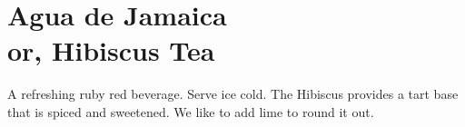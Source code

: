 \section[Agua de Jamaica]{Agua de Jamaica\\or, Hibiscus Tea}

\begin{recipestats}[
        servings=1~\gallon,
        preptime=10~\minute,
        bakingtime=45~\minute,
        inactivetime=15~\minute,
        original=\cite{aguaDeJamaica},
        source=Mike \& Jane,
    ]
\end{recipestats}

\begin{recipeabstract}
    A refreshing ruby red beverage.
    Serve ice cold.
    The Hibiscus provides a tart base that is spiced and sweetened.
    We like to add lime to round it out.
\end{recipeabstract}

\begin{ingredientcolumns}
    \begin{ingredientblock}
        \\
        \\
        \\
    \end{ingredientblock}
    \begin{ingredientblock}
        \\
        \\
        \\
        \\
    \end{ingredientblock}
\end{ingredientcolumns}
\pagebreak[1]

